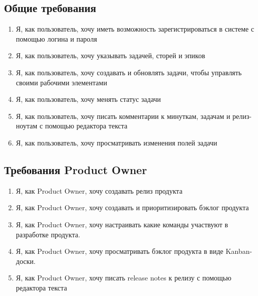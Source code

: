 \documentclass[14pt,a4paper]{extarticle}
\begin{document}
\subsection{Общие требования}
\begin{enumerate}[label=\textbf{FR\arabic*}.]
	\item Я, как пользователь, хочу иметь возможность зарегистрироваться в системе с помощью логина и пароля
	\item Я, как пользователь, хочу указывать  задачей, сторей и эпиков
	\item Я, как пользователь, хочу создавать и обновлять задачи, чтобы управлять своими рабочими элементами
	\item Я, как пользователь, хочу менять статус задачи
	\item Я, как пользователь, хочу писать комментарии к минуткам, задачам и релиз-ноутам с помощью редактора текста
	\item Я, как пользователь, хочу просматривать изменения полей задачи
\end{enumerate}

\subsection{Требования Product Owner}
\begin{enumerate}[label=\textbf{POR\arabic*}.]
	\item Я, как Product Owner, хочу создавать релиз продукта
	\item Я, как Product Owner, хочу создавать и приоритизировать бэклог продукта
	\item Я, как Product Owner, хочу настраивать какие команды участвуют в разработке продукта.
	\item Я, как Product Owner, хочу просматривать бэклог продукта в виде Kanban-доски.
	\item Я, как Product Owner, хочу писать release notes к релизу с помощью редактора текста
\end{enumerate}
\end{document}
